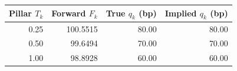 {\small\begin{tabular}{rrrr}
\toprule
Pillar $T_k$ & Forward $F_k$ & True $q_k$ (bp) & Implied $q_k$ (bp) \\
\midrule
\num{0.25} & \num{100.5515} & \num{80.00} & \num{80.00} \\
\num{0.50} & \num{99.6494} & \num{70.00} & \num{70.00} \\
\num{1.00} & \num{98.8928} & \num{60.00} & \num{60.00} \\
\bottomrule
\end{tabular}}
